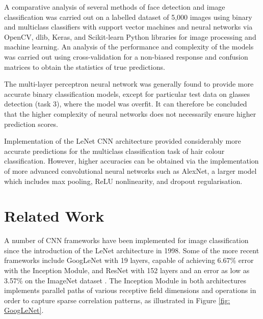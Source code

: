 \documentclass[conference]{IEEEtran}
\begin{document}

A comparative analysis of several methods of face detection and image classification was carried out on a labelled dataset of 5,000 images using binary and multiclass classifiers with support vector machines and neural networks via OpenCV, dlib, Keras, and Scikit-learn Python libraries for image processing and machine learning. An analysis of the performance and complexity of the models was carried out using cross-validation for a non-biased response and confusion matrices to obtain the statistics of true predictions. 

The multi-layer perceptron neural network was generally found to provide more accurate binary classification models, except for particular test data on glasses detection (task 3), where the model was overfit. It can therefore be concluded that the higher complexity of neural networks does not necessarily ensure higher prediction scores.

Implementation of the LeNet CNN architecture provided considerably more accurate predictions for the multiclass classification task of hair colour classification. However, higher accuracies can be obtained via the implementation of more advanced convolutional neural networks such as AlexNet, a larger model which includes max pooling, ReLU nonlinearity, and dropout regularisation.

\section{Related Work} \label{s-rel-work}


A number of CNN frameworks have been implemented for image classification since the introduction of the LeNet architecture in 1998. Some of the more recent frameworks include GoogLeNet with 19 layers, capable of achieving 6.67\% error with the Inception Module,
and ResNet with 152 layers and an error as low as 3.57\% on the ImageNet dataset \cite{He2006}. The Inception Module in both architectures implements parallel paths of various receptive field dimensions and operations in order to capture sparse correlation patterns, as illustrated in Figure \ref{fig: GoogLeNet}.
\end{document}
